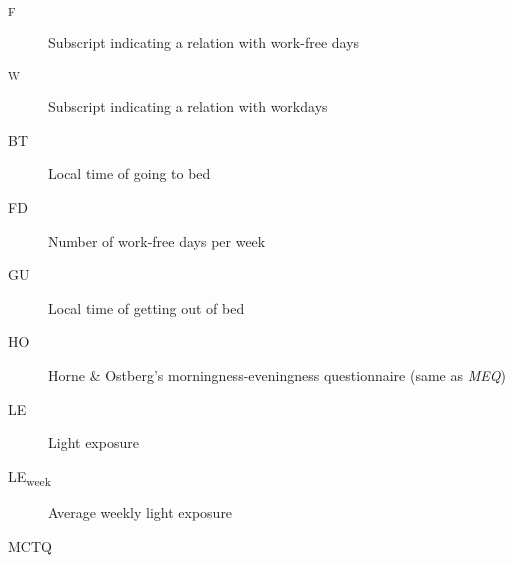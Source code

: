 

\listoffigures*
\cleardoublepage


\listoftables*
\cleardoublepage


\begin{siglas}

\begin{description}
\item[\textsubscript{F}]
\hspace{20cm}

Subscript indicating a relation with work-free days
\item[\textsubscript{W}]
\hspace{20cm}

Subscript indicating a relation with workdays
\item[BT]
\hspace{20cm}

Local time of going to bed
\item[FD]
\hspace{20cm}

Number of work-free days per week
\item[GU]
\hspace{20cm}

Local time of getting out of bed
\item[HO]
\hspace{20cm}

Horne \& Ostberg's morningness-eveningness questionnaire (same as
\emph{MEQ})
\item[LE]
\hspace{20cm}

Light exposure
\item[LE\textsubscript{week}]
\hspace{20cm}

Average weekly light exposure
\item[MCTQ]
\hspace{20cm}


\end{description}
\end{siglas}
